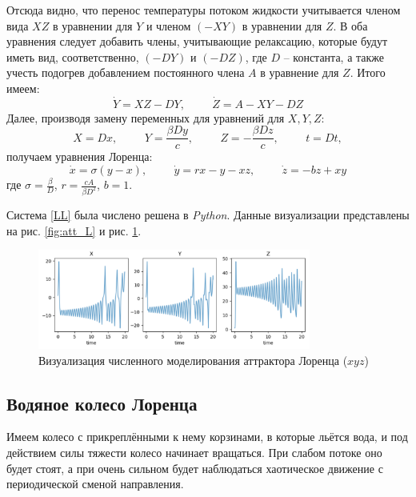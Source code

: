 Отсюда видно, что перенос температуры потоком жидкости учитывается членом вида $X Z$ в уравнении для $Y$ и членом $(- X Y)$ в уравнении для $Z$. В оба уравнения следует добавить члены, учитывающие релаксацию, которые будут иметь вид, соответственно, $(- D Y)$ и $(- D Z)$, где $D$ -- константа, а также учесть подогрев добавлением постоянного члена $A$ в уравнение для $Z$. Итого имеем:
$$\dot{Y} = X Z - D Y, \hspace{1cm} \dot{Z} = A - X Y - D Z$$
Далее, производя замену переменных для уравнений для $X, Y, Z$:
$$X = D x, \hspace{1cm} Y = \frac{\beta D y}{c}, \hspace{1cm} Z = -\frac{\beta D z}{c}, \hspace{1cm} t = D t,$$
получаем уравнения Лоренца:
\begin{equation}
    \label{LL}
\boxed{\dot{x} = \sigma(y-x), \hspace{1cm} \dot{y} = r x - y -x z, \hspace{1cm} \dot{z} = -b z + x y}
\end{equation}
где $\sigma = \frac{\beta}{D}$, $r = \frac{c A}{\beta D^2}$, $b =1$. 

Система \eqref{LL} была числено решена в \textit{Python}. Данные визуализации представлены на рис. \ref{fig:att_L} и рис. \ref{fig:xyz}.

\begin{figure}
    \centering
    \includegraphics[width=0.8\textwidth]{img/xyz.png}
    \caption{Визуализация численного моделирования аттрактора Лоренца ($xyz$)}
    \label{fig:xyz}
\end{figure}


\subsection{Водяное колесо Лоренца}

Имеем колесо с прикреплёнными к нему корзинами, в которые льётся вода, и под действием силы тяжести колесо начинает вращаться. 
При слабом потоке оно будет стоят, а при очень сильном будет наблюдаться хаотическое движение с периодической сменой направления.

